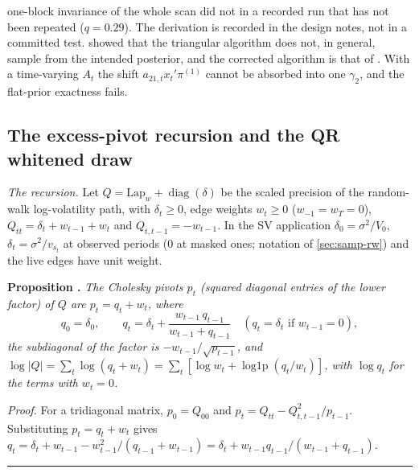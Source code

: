 one-block invariance of the whole scan did not in a recorded run that has not been repeated
($q = 0.29$).
The derivation is recorded in the design notes, not in a committed test.
\citet{bognanni2022comment} showed that the triangular algorithm does not, in general, sample from
the intended posterior, and the corrected algorithm is that of \citet{carriero2022corrigendum}.
With a time-varying $A_t$ the shift $a_{21,t}x_t'\pi^{(1)}$ cannot be absorbed into one $\gamma_2$,
and the flat-prior exactness fails.

\subsection{The excess-pivot recursion and the QR whitened draw}\label{app:pivots}

\emph{The recursion.}
Let $Q = \mathrm{Lap}_w + \operatorname{diag}(\delta)$ be the scaled precision of the random-walk
log-volatility path, with $\delta_t \ge 0$, edge weights $w_t \ge 0$ ($w_{-1} = w_{T} = 0$),
$Q_{tt} = \delta_t + w_{t-1} + w_t$ and $Q_{t,t-1} = -w_{t-1}$.
In the SV application $\delta_0 = \sigma^2/V_0$, $\delta_t = \sigma^2/v_{s_t}$ at observed periods ($0$ at
masked ones; notation of \cref{sec:samp-rw}) and the live edges have
unit weight.

\medskip\noindent\textbf{Proposition \thesubsection.}\label{prop:excess-pivot} \textit{The Cholesky pivots $p_t$ (squared diagonal entries
of the lower factor) of $Q$ are $p_t = q_t + w_t$, where}
\begin{equation}\label{eq:B-excess-pivot}
q_0 = \delta_0, \qquad q_t = \delta_t + \frac{w_{t-1}\,q_{t-1}}{w_{t-1} + q_{t-1}} \quad (q_t =
\delta_t \text{ if } w_{t-1} = 0),
\end{equation}
\textit{the subdiagonal of the factor is $-w_{t-1}/\sqrt{p_{t-1}}$, and $\log|Q| = \sum_t
\log(q_t + w_t) = \sum_t [\log w_t + \operatorname{log1p}(q_t/w_t)]$, with $\log q_t$ for the terms
with $w_t = 0$.}

\noindent\textit{Proof.}
For a tridiagonal matrix, $p_0 = Q_{00}$ and $p_t = Q_{tt} - Q_{t,t-1}^2/p_{t-1}$.
Substituting $p_t = q_t + w_t$ gives $q_t = \delta_t + w_{t-1} - w_{t-1}^2/(q_{t-1} + w_{t-1}) =
\delta_t + w_{t-1}q_{t-1}/(w_{t-1} + q_{t-1})$.
\hfill\rule{0.5em}{0.5em}


